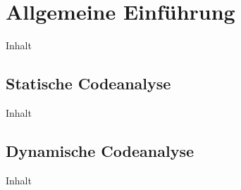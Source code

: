 \chapter{Allgemeine Einführung\label{chap2:Zweites-Kapitel}}

Inhalt

\section{Statische Codeanalyse\label{sec2.1:Unterpunkt-1}}

Inhalt

\section{Dynamische Codeanalyse\label{sec2.2:Unterpunkt-2}}

Inhalt